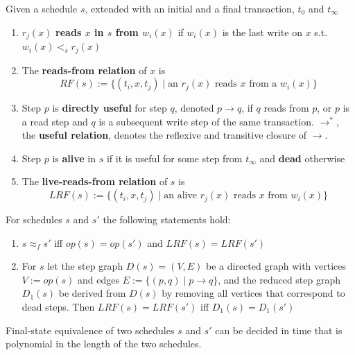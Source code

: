 \documentclass[11pt]{article}
\begin{document}
\begin{definition}
Given a schedule \(s\), extended with an initial and a final transaction, \(t_0\)
and \(t_\infty\)
\begin{enumerate}
\item \(r_j(x)\) \textbf{reads \(x\) in \(s\) from \(w_i(x)\)} if \(w_i(x)\) is the last write on \(x\)
s.t. \(w_i(x)<_sr_j(x)\)
\item The \textbf{reads-from relation} of \(x\) is
\begin{equation*}
RF(s):=\{(t_i,x,t_j)\mid \text{an }r_j(x)\text{ reads \(x\) from a }w_i(x)\}
\end{equation*}
\item Step \(p\) is \textbf{directly useful} for step \(q\), denoted \(p\to q\), if \(q\) reads from \(p\),
or \(p\) is a read step and \(q\) is a subsequent write step of the same
transaction. \(\to^*\), the \textbf{useful relation}, denotes the reflexive and transitive closure of \(\to\).
\item Step \(p\) is \textbf{alive} in \(s\) if it is useful for some step from \(t_\infty\) and \textbf{dead}
otherwise
\item The \textbf{live-reads-from relation} of \(s\) is
\begin{equation*}
LRF(s):=\{(t_i,x,t_j)\mid \text{an alive \(r_j(x)\) reads \(x\) from \(w_i(x)\)}\}
\end{equation*}
\end{enumerate}
\end{definition}

\begin{theorem}[]
For schedules \(s\) and \(s'\) the following statements hold:
\begin{enumerate}
\item \(s\approx_fs'\) iff \(op(s)=op(s')\) and \(LRF(s)=LRF(s')\)
\item For \(s\) let the step graph \(D(s)=(V,E)\) be a directed graph with vertices \(V:=op(s)\)
and edges \(E:=\{(p,q)\mid p\to q\}\), and the reduced step graph \(D_1(s)\) be derived
from \(D(s)\) by removing all vertices that correspond to dead steps. Then \(LRF(s)=LRF(s')\)
iff \(D_1(s)=D_1(s')\)
\end{enumerate}
\end{theorem}

\begin{corollary}[]
Final-state equivalence of two schedules \(s\) and \(s'\) can be decided in time that is
polynomial in the length of the two schedules.
\end{corollary}
\end{document}

